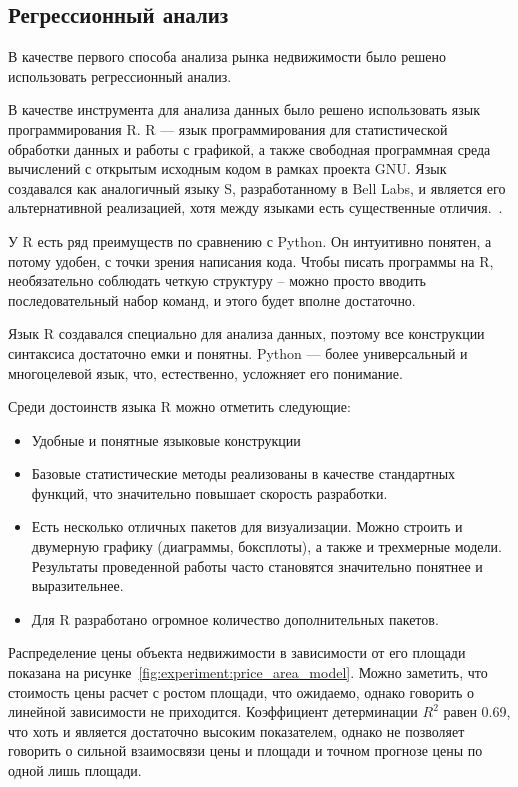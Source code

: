  
\subsection{Регрессионный анализ}
\label{sec:experiment:regression}


В качестве первого способа анализа рынка недвижимости было решено использовать регрессионный анализ.

В качестве инструмента для анализа данных было решено использовать язык программирования R. R — язык программирования
для статистической обработки данных и работы с графикой, а также свободная программная среда вычислений с открытым
исходным кодом в рамках проекта GNU. Язык создавался как аналогичный языку S, разработанному в Bell Labs, и является
его альтернативной реализацией, хотя между языками есть существенные отличия.~\cite{r_lang}.

У R есть ряд преимуществ по сравнению с Python. Он интуитивно понятен, а потому удобен,
с точки зрения написания кода. Чтобы писать программы на R, необязательно соблюдать четкую структуру – можно просто
вводить последовательный набор команд, и этого будет вполне достаточно.

Язык R создавался специально для анализа данных, поэтому все конструкции синтаксиса достаточно емки и понятны.
Python — более универсальный и многоцелевой язык, что, естественно, усложняет его понимание.

Среди достоинств языка R можно отметить следующие:
\begin{itemize}
  \item Удобные и понятные языковые конструкции
  \item Базовые статистические методы реализованы в качестве стандартных функций, что значительно повышает скорость разработки.
  \item Есть несколько отличных пакетов для визуализации. Можно строить и двумерную графику (диаграммы, боксплоты), а также и трехмерные модели. Результаты проведенной работы часто становятся значительно понятнее и выразительнее.
  \item Для R разработано огромное количество дополнительных пакетов.
\end{itemize}

Распределение цены объекта недвижимости в зависимости от его площади показана на рисунке~\ref{fig:experiment:price_area_model}.
Можно заметить, что стоимость цены расчет с ростом площади, что ожидаемо, однако говорить о линейной зависимости не приходится.
Коэффициент детерминации $R^2$ равен 0.69, что хоть и является достаточно высоким показателем, однако
не позволяет говорить о сильной взаимосвязи цены и площади и точном прогнозе цены по одной лишь площади.


